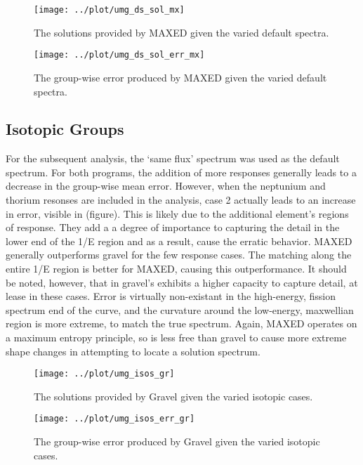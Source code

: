 \documentclass[journal]{IEEEtran}
\begin{document}
\begin{figure}[h!tb]
  \centering
  \texttt{[image: ../plot/umg\_ds\_sol\_mx]}
  \caption{The solutions provided by MAXED given the varied default spectra.}
  \label{fig:ds_sol_mx}
\end{figure}

\begin{figure}[h!tb]
  \centering
  \texttt{[image: ../plot/umg\_ds\_sol\_err\_mx]}
  \caption{The group-wise error produced by MAXED given the varied default spectra.}
  \label{fig:ds_err_mx}
\end{figure}


\subsection{Isotopic Groups}

For the subsequent analysis, the `same flux' spectrum was used as the default spectrum.
For both programs, the addition of more responses generally leads to a decrease in the group-wise mean error.
However, when the neptunium and thorium resonses are included in the analysis, case 2 actually leads to an increase in error, visible in (figure).
This is likely due to the additional element's regions of response.
They add a a degree of importance to capturing the detail in the lower end of the 1/E region and as a result, cause the erratic behavior.
MAXED generally outperforms gravel for the few response cases.
The matching along the entire 1/E region is better for MAXED, causing this outperformance.
It should be noted, however, that in gravel's exhibits a higher capacity to capture detail, at lease in these cases.
Error is virtually non-existant in the high-energy, fission spectrum end of the curve, and the curvature around the low-energy, maxwellian region is more extreme, to match the true spectrum.
Again, MAXED operates on a maximum entropy principle, so is less free than gravel to cause more extreme shape changes in attempting to locate a solution spectrum.



\begin{figure}[h!tb]
  \centering
  \texttt{[image: ../plot/umg\_isos\_gr]}
  \caption{The solutions provided by Gravel given the varied isotopic cases.}
  \label{fig:isos_gr}
\end{figure}

\begin{figure}[h!tb]
  \centering
  \texttt{[image: ../plot/umg\_isos\_err\_gr]}
  \caption{The group-wise error produced by Gravel given the varied isotopic cases.}
  \label{fig:isos_err_gr}
\end{figure}
\end{document}
